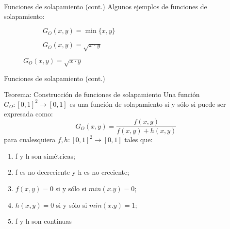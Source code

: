 \documentclass{beamer}
\begin{document}
\begin{frame}{Funciones de solapamiento (cont.)}
	Algunos ejemplos de funciones de solapamiento:
	\begin{figure}
	\begin{subfigure}{0.45\textwidth}
		\caption{$G_{O}(x,y) = \min\{x,y\}$}
		\setlength\figureheight{3cm}
		\setlength\figurewidth{4cm}
		
	\end{subfigure}
	\qquad
	\begin{subfigure}{0.45\textwidth}
		\caption{$G_{O}(x,y) = \sqrt{x \cdot y}$}
		\setlength\figureheight{3cm}
		\setlength\figurewidth{4cm}
		
	\end{subfigure}
	\end{figure}
\end{frame}

\iffalse
\begin{frame}{Funciones de solapamiento (cont.)}
	\begin{block}{Teorema: Construcción de funciones de solapamiento}
		Una función $G_{O} : [0,1]^{2} \rightarrow [0,1]$ es una función de solapamiento si y sólo si puede ser expresada como:
		\begin{equation}
		G_{O}(x,y) = \frac{f(x,y)}{f(x,y) + h(x,y)}
		\end{equation}
		para cualesquiera $f,h: [0,1]^{2} \rightarrow [0,1]$ tales que:
		\begin{enumerate}
		   \item f y h son simétricas;
		   \item f es no decreciente y h es no creciente;
		   \item $f(x,y) = 0$ si y sólo si $min(x.y) = 0$;
		   \item $h(x,y) = 0$ si y sólo si $min(x.y) = 1$;
		   \item f y h son continuas
		\end{enumerate}
	\end{block}
\end{frame}
\end{document}
